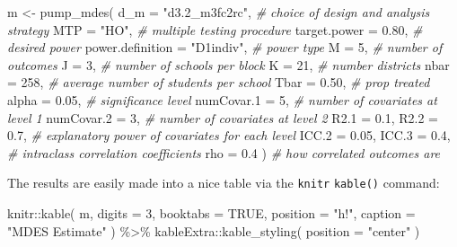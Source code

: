 \documentclass{article}
\newenvironment{Shaded}{\begin{snugshade}}{\end{snugshade}}
\newcommand{\AttributeTok}[1]{\textcolor[rgb]{0.77,0.63,0.00}{#1}}
\newcommand{\CommentTok}[1]{\textcolor[rgb]{0.56,0.35,0.01}{\textit{#1}}}
\newcommand{\ConstantTok}[1]{\textcolor[rgb]{0.00,0.00,0.00}{#1}}
\newcommand{\DecValTok}[1]{\textcolor[rgb]{0.00,0.00,0.81}{#1}}
\newcommand{\FloatTok}[1]{\textcolor[rgb]{0.00,0.00,0.81}{#1}}
\newcommand{\FunctionTok}[1]{\textcolor[rgb]{0.00,0.00,0.00}{#1}}
\newcommand{\NormalTok}[1]{#1}
\newcommand{\OtherTok}[1]{\textcolor[rgb]{0.56,0.35,0.01}{#1}}
\newcommand{\SpecialCharTok}[1]{\textcolor[rgb]{0.00,0.00,0.00}{#1}}
\newcommand{\StringTok}[1]{\textcolor[rgb]{0.31,0.60,0.02}{#1}}
\begin{document}
\begin{Shaded}
\begin{Highlighting}[]
\NormalTok{m }\OtherTok{\textless{}{-}} \FunctionTok{pump\_mdes}\NormalTok{(}
  \AttributeTok{d\_m =} \StringTok{"d3.2\_m3fc2rc"}\NormalTok{,      }\CommentTok{\# choice of design and analysis strategy}
  \AttributeTok{MTP =} \StringTok{"HO"}\NormalTok{,                 }\CommentTok{\# multiple testing procedure}
  \AttributeTok{target.power =} \FloatTok{0.80}\NormalTok{,          }\CommentTok{\# desired power}
  \AttributeTok{power.definition =} \StringTok{"D1indiv"}\NormalTok{, }\CommentTok{\# power type}
  \AttributeTok{M =} \DecValTok{5}\NormalTok{,                        }\CommentTok{\# number of outcomes}
  \AttributeTok{J =} \DecValTok{3}\NormalTok{,                        }\CommentTok{\# number of schools per block}
  \AttributeTok{K =} \DecValTok{21}\NormalTok{,                       }\CommentTok{\# number districts}
  \AttributeTok{nbar =} \DecValTok{258}\NormalTok{,                   }\CommentTok{\# average number of students per school}
  \AttributeTok{Tbar =} \FloatTok{0.50}\NormalTok{,                  }\CommentTok{\# prop treated}
  \AttributeTok{alpha =} \FloatTok{0.05}\NormalTok{,                 }\CommentTok{\# significance level}
  \AttributeTok{numCovar.1 =} \DecValTok{5}\NormalTok{,               }\CommentTok{\# number of covariates at level 1}
  \AttributeTok{numCovar.2 =} \DecValTok{3}\NormalTok{,               }\CommentTok{\# number of covariates at level 2}
  \AttributeTok{R2.1 =} \FloatTok{0.1}\NormalTok{, }\AttributeTok{R2.2 =} \FloatTok{0.7}\NormalTok{,       }\CommentTok{\# explanatory power of covariates for each level}
  \AttributeTok{ICC.2 =} \FloatTok{0.05}\NormalTok{, }\AttributeTok{ICC.3 =} \FloatTok{0.4}\NormalTok{,    }\CommentTok{\# intraclass correlation coefficients}
  \AttributeTok{rho =} \FloatTok{0.4}\NormalTok{ )                   }\CommentTok{\# how correlated outcomes are}
\end{Highlighting}
\end{Shaded}

The results are easily made into a nice table via the \texttt{knitr}
\texttt{kable()} command:

\begin{Shaded}
\begin{Highlighting}[]
\NormalTok{knitr}\SpecialCharTok{::}\FunctionTok{kable}\NormalTok{( m, }\AttributeTok{digits =} \DecValTok{3}\NormalTok{, }\AttributeTok{booktabs =} \ConstantTok{TRUE}\NormalTok{,}
              \AttributeTok{position =} \StringTok{"h!"}\NormalTok{, }\AttributeTok{caption =} \StringTok{"MDES Estimate"}\NormalTok{ ) }\SpecialCharTok{\%\textgreater{}\%}
\NormalTok{  kableExtra}\SpecialCharTok{::}\FunctionTok{kable\_styling}\NormalTok{( }\AttributeTok{position =} \StringTok{"center"}\NormalTok{ )}
\end{Highlighting}
\end{Shaded}
\end{document}
